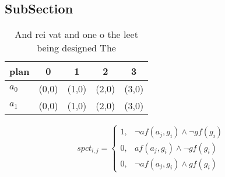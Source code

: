 \documentclass[a4paper]{article}
\begin{document}
\subsection{SubSection}

\begin{table}
\begin{adjustbox}{width=0.8\columnwidth}
\begin{tabular}{|l|l|l|l|l|}
\hline
\textbf{plan} & \multicolumn{1}{c|}{\textbf{0}} & \multicolumn{1}{c|}{\textbf{1}} & \multicolumn{1}{c|}{\textbf{2}} & \multicolumn{1}{c|}{\textbf{3}} \\ \hline
\textbf{$a_0$}  & (0,0) & (1,0) & (2,0) & (3,0) \\ \hline
\textbf{$a_1$}  & (0,0) & (1,0) & (2,0) & (3,0) \\ \hline
\end{tabular}
\end{adjustbox}
\caption{And rei vat and one o the leet being designed The
}
\end{table}

\begin{equation}
spct_{i,j} =
\begin{cases}
1, & \text{$\neg af(a_j,g_i) \wedge \neg gf(g_i)$}\\
0, & \text{$af(a_j,g_i) \wedge \neg gf(g_i)$}\\
0, & \text{$\neg af(a_j,g_i) \wedge gf(g_i)$}
\end{cases}
\end{equation}
\end{document}
